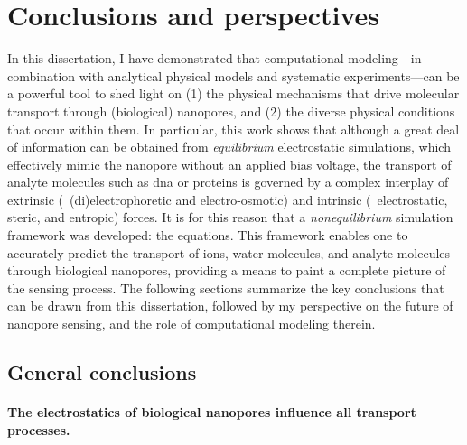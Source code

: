 \chapter{Conclusions and perspectives}
%
\label{ch:conclusion}
%

%
%


In this dissertation, I have demonstrated that computational modeling---in combination with analytical
physical models and systematic experiments---can be a powerful tool to shed light on (1) the physical
mechanisms that drive molecular transport through (biological) nanopores, and (2) the diverse physical
conditions that occur within them. In particular, this work shows that although a great deal of information
can be obtained from \emph{equilibrium} electrostatic simulations, which effectively mimic the nanopore
without an applied bias voltage, the transport of analyte molecules such as \gls{dna} or proteins is governed
by a complex interplay of extrinsic (\ie~(di)electrophoretic and electro-osmotic) and intrinsic
(\ie~electrostatic, steric, and entropic) forces. It is for this reason that a \emph{nonequilibrium}
simulation framework was developed: the  equations. This framework enables one to accurately
predict the transport of ions, water molecules, and analyte molecules through biological nanopores, providing
a means to paint a complete picture of the sensing process. The following sections summarize the key
conclusions that can be drawn from this dissertation, followed by my perspective on the future of nanopore
sensing, and the role of computational modeling therein.


%
\section{General conclusions}
%
\label{sec:con:conclusions}
%



\subsubsection{The electrostatics of biological nanopores influence all transport processes.}
%

